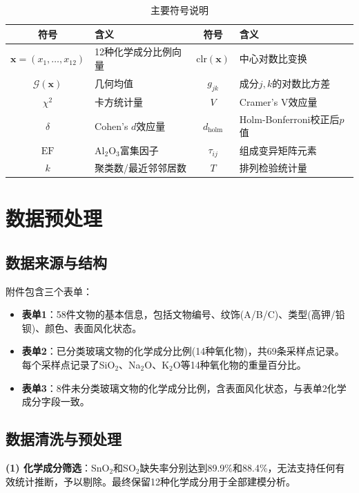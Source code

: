 \documentclass[12pt,a4paper]{ctexart}
\begin{document}
\begin{table}[H]
\centering
\caption{主要符号说明}
\begin{tabular}{c|l|c|l}
\toprule
\textbf{符号} & \textbf{含义} & \textbf{符号} & \textbf{含义} \\
\midrule
$\mathbf{x} = (x_1,\dots,x_{12})$ & 12种化学成分比例向量 & $\text{clr}(\mathbf{x})$ & 中心对数比变换 \\
$\mathcal{G}(\mathbf{x})$ & 几何均值 & $g_{jk}$ & 成分$j,k$的对数比方差 \\
$\chi^2$ & 卡方统计量 & $V$ & Cramer's V效应量 \\
$\delta$ & Cohen's $d$效应量 & $d_{\text{holm}}$ & Holm-Bonferroni校正后$p$值 \\
$\text{EF}$ & Al$_2$O$_3$富集因子 & $\tau_{ij}$ & 组成变异矩阵元素 \\
$k$ & 聚类数/最近邻邻居数 & $T$ & 排列检验统计量 \\
\bottomrule
\end{tabular}
\end{table}

\section{数据预处理}

\subsection{数据来源与结构}

附件包含三个表单：
\begin{itemize}
    \item \textbf{表单1}：58件文物的基本信息，包括文物编号、纹饰(A/B/C)、类型(高钾/铅钡)、颜色、表面风化状态。
    \item \textbf{表单2}：已分类玻璃文物的化学成分比例(14种氧化物)，共69条采样点记录。每个采样点记录了SiO$_2$、Na$_2$O、K$_2$O等14种氧化物的重量百分比。
    \item \textbf{表单3}：8件未分类玻璃文物的化学成分比例，含表面风化状态，与表单2化学成分字段一致。
\end{itemize}

\subsection{数据清洗与预处理}

\textbf{(1) 化学成分筛选}：SnO$_2$和SO$_2$缺失率分别达到89.9\%和88.4\%，无法支持任何有效统计推断，予以剔除。最终保留12种化学成分用于全部建模分析。
\end{document}
